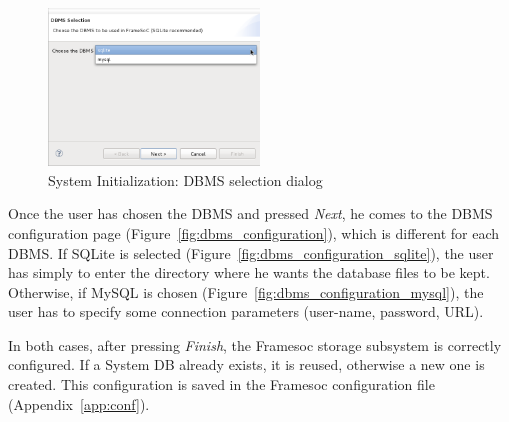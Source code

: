 \documentclass[twoside]{article}
\begin{document}
\begin{sloppypar}
\begin{figure}[h!]
  \centering
    \includegraphics[width=0.5\textwidth]{images/dbms_selection.png}
  \caption{System Initialization: DBMS selection dialog}
  \label{fig:dbms_selection}
\end{figure}

Once the user has chosen the DBMS and pressed \emph{Next}, he comes to the DBMS configuration page (Figure~\ref{fig:dbms_configuration}), which is different for each DBMS.
If SQLite is selected (Figure~\ref{fig:dbms_configuration_sqlite}), the user has simply to enter the directory where he wants the database files to be kept.
Otherwise, if MySQL is chosen (Figure~\ref{fig:dbms_configuration_mysql}), the user has to specify some connection parameters (user-name, password, URL).

In both cases, after pressing \emph{Finish}, the Framesoc storage subsystem is correctly configured. 
If a System DB already exists, it is reused, otherwise a new one is created.
This configuration is saved in the Framesoc configuration file (Appendix~\ref{app:conf}). %


\end{sloppypar}
\end{document}
